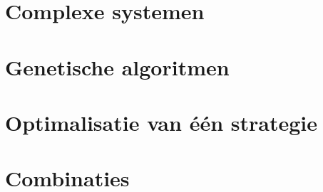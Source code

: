 \section{Complexe systemen}

\section{Genetische algoritmen}

\section{Optimalisatie van één strategie}
\section{Combinaties}

